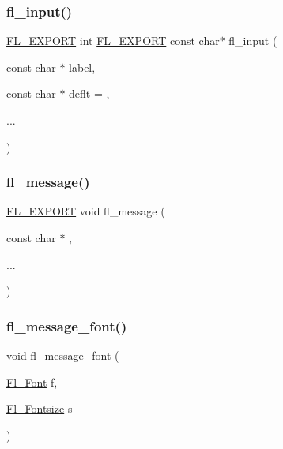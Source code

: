 \mbox{\label{fl__ask_8_h_ad235044a6890447148512cc147d15124}} 
\subsubsection{\texorpdfstring{fl\+\_\+input()}{fl\_input()}}
{\footnotesize\ttfamily \hyperlink{_fl___export_8_h_aa9ba29a18aee9d738370a06eeb4470fc}{F\+L\+\_\+\+E\+X\+P\+O\+RT} int \hyperlink{_fl___export_8_h_aa9ba29a18aee9d738370a06eeb4470fc}{F\+L\+\_\+\+E\+X\+P\+O\+RT} const char$\ast$ fl\+\_\+input (\begin{DoxyParamCaption}\item[{const char $\ast$}]{label,  }\item[{const char $\ast$}]{deflt = {},  }\item[{}]{... }\end{DoxyParamCaption})}

\mbox{\label{fl__ask_8_h_a39c7e2361ffcf61722c22aadbf2b96ab}} 
\subsubsection{\texorpdfstring{fl\+\_\+message()}{fl\_message()}}
{\footnotesize\ttfamily \hyperlink{_fl___export_8_h_aa9ba29a18aee9d738370a06eeb4470fc}{F\+L\+\_\+\+E\+X\+P\+O\+RT} void fl\+\_\+message (\begin{DoxyParamCaption}\item[{const char $\ast$}]{,  }\item[{}]{... }\end{DoxyParamCaption})}

\mbox{\label{fl__ask_8_h_aafb997b8fea4974259984a410db161a2}} 
\subsubsection{\texorpdfstring{fl\+\_\+message\+\_\+font()}{fl\_message\_font()}}
{\footnotesize\ttfamily void fl\+\_\+message\+\_\+font (\begin{DoxyParamCaption}\item[{\hyperlink{_enumerations_8_h_a2ac46d9f082834b969fffe490a03a709}{Fl\+\_\+\+Font}}]{f,  }\item[{\hyperlink{_enumerations_8_h_ad58927f5c691454480f7cd28362502f1}{Fl\+\_\+\+Fontsize}}]{s }\end{DoxyParamCaption})\hspace{0.3cm}{\ttfamily [inline]}}


